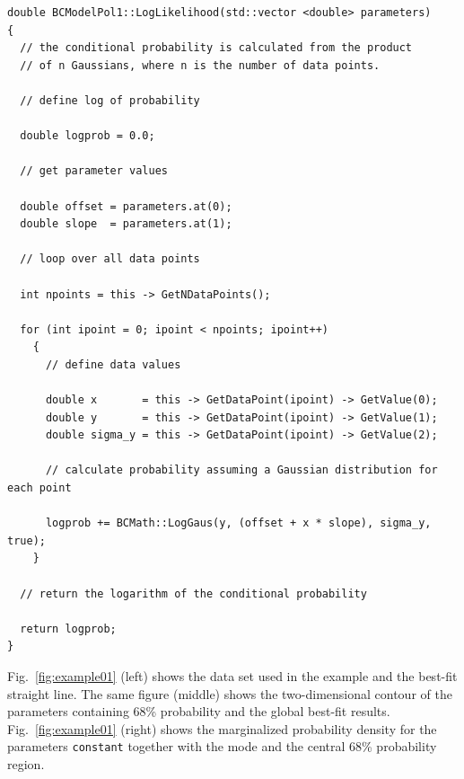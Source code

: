 \documentclass[11pt, a4paper]{article}
\begin{document}
\begin{small}
\begin{verbatim}
double BCModelPol1::LogLikelihood(std::vector <double> parameters)
{
  // the conditional probability is calculated from the product 
  // of n Gaussians, where n is the number of data points. 

  // define log of probability

  double logprob = 0.0;

  // get parameter values

  double offset = parameters.at(0);
  double slope  = parameters.at(1);

  // loop over all data points

  int npoints = this -> GetNDataPoints();

  for (int ipoint = 0; ipoint < npoints; ipoint++)
    {
      // define data values

      double x       = this -> GetDataPoint(ipoint) -> GetValue(0);
      double y       = this -> GetDataPoint(ipoint) -> GetValue(1);
      double sigma_y = this -> GetDataPoint(ipoint) -> GetValue(2);

      // calculate probability assuming a Gaussian distribution for each point
 
      logprob += BCMath::LogGaus(y, (offset + x * slope), sigma_y, true);
    }

  // return the logarithm of the conditional probability 

  return logprob; 
}
\end{verbatim} 
\end{small} 

\noindent 
Fig.~\ref{fig:example01} (left) shows the data set used in the example
and the best-fit straight line. The same figure (middle) shows the
two-dimensional contour of the parameters containing 68\% probability
and the global best-fit results. Fig.~\ref{fig:example01} (right)
shows the marginalized probability density for the parameters
\verb|constant| together with the mode and the central 68\%
probability region.
\end{document}
